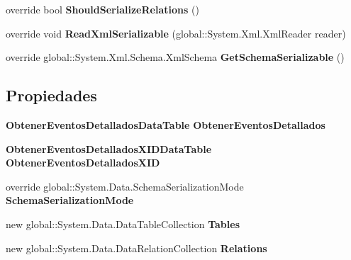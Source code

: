 \begin{DoxyCompactItemize}
\item 
override bool {\bfseries Should\+Serialize\+Relations} ()\label{class_resa___pro_1_1_resa_d_b_data_set_a8ec113b648b161171a15b573716bf371}

\item 
override void {\bfseries Read\+Xml\+Serializable} (global\+::\+System.\+Xml.\+Xml\+Reader reader)\label{class_resa___pro_1_1_resa_d_b_data_set_af6b107ce1956604eda441a315e6fcb54}

\item 
override global\+::\+System.\+Xml.\+Schema.\+Xml\+Schema {\bfseries Get\+Schema\+Serializable} ()\label{class_resa___pro_1_1_resa_d_b_data_set_a63c240e1194fc8bc9334faa718bac9b3}

\end{DoxyCompactItemize}
\subsection*{Propiedades}
\begin{DoxyCompactItemize}
\item 
{\bf Obtener\+Eventos\+Detallados\+Data\+Table} {\bfseries Obtener\+Eventos\+Detallados}\hspace{0.3cm}{\ttfamily  [get]}\label{class_resa___pro_1_1_resa_d_b_data_set_a13d547d75806c6543c44240632caf525}

\item 
{\bf Obtener\+Eventos\+Detallados\+X\+I\+D\+Data\+Table} {\bfseries Obtener\+Eventos\+Detallados\+X\+ID}\hspace{0.3cm}{\ttfamily  [get]}\label{class_resa___pro_1_1_resa_d_b_data_set_a8624e24984a38dd74f0a514783acae5d}

\item 
override global\+::\+System.\+Data.\+Schema\+Serialization\+Mode {\bfseries Schema\+Serialization\+Mode}\hspace{0.3cm}{\ttfamily  [get, set]}\label{class_resa___pro_1_1_resa_d_b_data_set_ae33d5e7d58f95e5df39a393799242dd9}

\item 
new global\+::\+System.\+Data.\+Data\+Table\+Collection {\bfseries Tables}\hspace{0.3cm}{\ttfamily  [get]}\label{class_resa___pro_1_1_resa_d_b_data_set_a5bb8577278bee490ca5cdba6ad595c06}

\item 
new global\+::\+System.\+Data.\+Data\+Relation\+Collection {\bfseries Relations}\hspace{0.3cm}{\ttfamily  [get]}\label{class_resa___pro_1_1_resa_d_b_data_set_a62f91afc35b0ce48503646f4a59ea3a5}

\end{DoxyCompactItemize}



